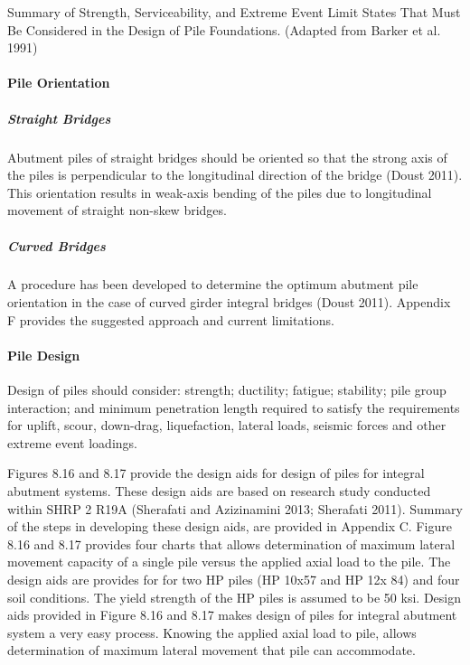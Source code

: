 \begin{table}
  \caption{Summary of Strength, Serviceability, and Extreme Event Limit States That Must Be Considered in the Design of Pile Foundations. (Adapted from Barker et al. 1991)}
  \label{tab:summary-limit-states}
\end{table}

\paragraph{Pile Orientation}
\subparagraph{Straight Bridges}
Abutment piles of straight bridges should be oriented so that the strong axis of the piles is perpendicular to the
longitudinal direction of the bridge (Doust 2011). This orientation results in weak-axis bending of the piles due to
longitudinal movement of straight non-skew bridges.

\subparagraph{Curved Bridges}
A procedure has been developed to determine the optimum abutment pile orientation in the case of curved girder
integral bridges (Doust 2011). Appendix F provides the suggested approach and current limitations.

\paragraph{Pile Design}
Design of piles should consider: strength; ductility; fatigue; stability; pile group interaction; and minimum
penetration length required to satisfy the requirements for uplift, scour, down-drag, liquefaction, lateral loads, seismic
forces and other extreme event loadings.

Figures 8.16 and 8.17 provide the design aids for design of piles for integral abutment systems. These design aids
are based on research study conducted within SHRP 2 R19A (Sherafati and Azizinamini 2013; Sherafati 2011).
Summary of the steps in developing these design aids, are provided in Appendix C. Figure 8.16 and 8.17 provides
four charts that allows determination of maximum lateral movement capacity of a single pile versus the applied axial
load to the pile. The design aids are provides for for two HP piles (HP 10x57 and HP 12x 84) and four soil conditions.
The yield strength of the HP piles is assumed to be 50 ksi. Design aids provided in Figure 8.16 and 8.17 makes design of piles for integral abutment system a very easy process. Knowing the applied axial load to pile, allows determination
of maximum lateral movement that pile can accommodate.

